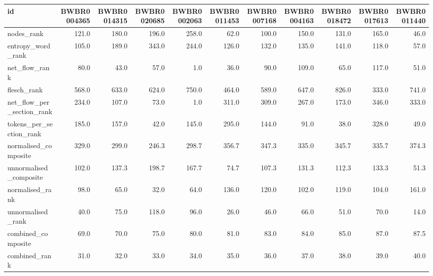 \begin{tabular}{lrrrrrrrrrr}
\toprule
id & BWBR0004365 & BWBR0014315 & BWBR0020685 & BWBR0002063 & BWBR0011453 & BWBR0007168 & BWBR0004163 & BWBR0018472 & BWBR0017613 & BWBR0011440 \\
\midrule
nodes\_rank & 121.0 & 180.0 & 196.0 & 258.0 & 62.0 & 100.0 & 150.0 & 131.0 & 165.0 & 46.0 \\
\cline{1-11}
entropy\_word\_rank & 105.0 & 189.0 & 343.0 & 244.0 & 126.0 & 132.0 & 135.0 & 141.0 & 118.0 & 57.0 \\
\cline{1-11}
net\_flow\_rank & 80.0 & 43.0 & 57.0 & 1.0 & 36.0 & 90.0 & 109.0 & 65.0 & 117.0 & 51.0 \\
\cline{1-11}
flesch\_rank & 568.0 & 633.0 & 624.0 & 750.0 & 464.0 & 589.0 & 647.0 & 826.0 & 333.0 & 741.0 \\
\cline{1-11}
net\_flow\_per\_section\_rank & 234.0 & 107.0 & 73.0 & 1.0 & 311.0 & 309.0 & 267.0 & 173.0 & 346.0 & 333.0 \\
\cline{1-11}
tokens\_per\_section\_rank & 185.0 & 157.0 & 42.0 & 145.0 & 295.0 & 144.0 & 91.0 & 38.0 & 328.0 & 49.0 \\
\cline{1-11}
normalised\_composite & 329.0 & 299.0 & 246.3 & 298.7 & 356.7 & 347.3 & 335.0 & 345.7 & 335.7 & 374.3 \\
\cline{1-11}
unnormalised\_composite & 102.0 & 137.3 & 198.7 & 167.7 & 74.7 & 107.3 & 131.3 & 112.3 & 133.3 & 51.3 \\
\cline{1-11}
normalised\_rank & 98.0 & 65.0 & 32.0 & 64.0 & 136.0 & 120.0 & 102.0 & 119.0 & 104.0 & 161.0 \\
\cline{1-11}
unnormalised\_rank & 40.0 & 75.0 & 118.0 & 96.0 & 26.0 & 46.0 & 66.0 & 51.0 & 70.0 & 14.0 \\
\cline{1-11}
combined\_composite & 69.0 & 70.0 & 75.0 & 80.0 & 81.0 & 83.0 & 84.0 & 85.0 & 87.0 & 87.5 \\
\cline{1-11}
combined\_rank & 31.0 & 32.0 & 33.0 & 34.0 & 35.0 & 36.0 & 37.0 & 38.0 & 39.0 & 40.0 \\
\cline{1-11}
\bottomrule
\end{tabular}
